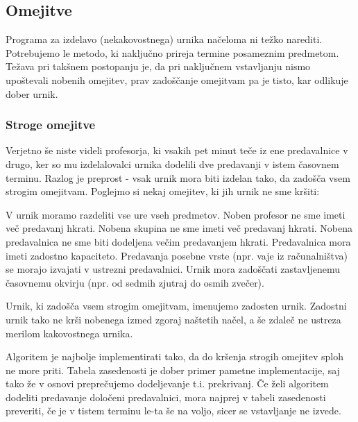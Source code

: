 \documentclass[a4paper]{article}
\begin{document}
\subsection{Omejitve} %

Programa za izdelavo (nekakovostnega) urnika načeloma ni težko narediti. Potrebujemo
le metodo, ki naključno prireja termine posameznim predmetom. Težava pri takšnem postopanju
je, da pri naključnem vstavljanju nismo upoštevali nobenih omejitev, prav zadoščanje omejitvam
pa je tisto, kar odlikuje dober urnik.

\subsubsection{Stroge omejitve} %

Verjetno še niste videli profesorja, ki vsakih pet minut teče iz ene predavalnice v drugo,
ker so mu izdelalovalci urnika dodelili dve predavanji v istem časovnem terminu. Razlog
je preprost - vsak urnik mora biti izdelan tako, da zadošča vsem strogim omejitvam.
Poglejmo si nekaj omejitev, ki jih urnik ne sme kršiti:

   V urnik moramo razdeliti vse ure vseh predmetov.
   Noben profesor ne sme imeti več predavanj hkrati.
   Nobena skupina ne sme imeti več predavanj hkrati.
   Nobena predavalnica ne sme biti dodeljena večim predavanjem hkrati.
   Predavalnica mora imeti zadostno kapaciteto.
   Predavanja posebne vrste (npr. vaje iz računalništva) se morajo izvajati v ustrezni predavalnici.
   Urnik mora zadoščati zastavljenemu časovnemu okvirju (npr. od sedmih zjutraj do osmih zvečer).

Urnik, ki zadošča vsem strogim omejitvam, imenujemo zadosten urnik. Zadostni urnik tako ne
krši nobenega izmed zgoraj naštetih načel, a še zdaleč ne ustreza merilom kakovostnega urnika.

Algoritem je najbolje implementirati tako, da do kršenja strogih omejitev sploh ne more priti.
Tabela zasedenosti je dober primer pametne implementacije, saj tako že v osnovi  preprečujemo
dodeljevanje t.i. prekrivanj. Če želi algoritem dodeliti predavanje določeni predavalnici,
mora najprej v tabeli zasedenosti preveriti, če je v tistem terminu le-ta še na voljo,
sicer se vstavljanje ne izvede.
\end{document}
